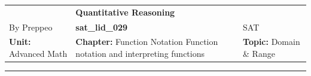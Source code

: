 \documentclass[11pt,paper=a4,answers]{exam}
\begin{document}
\begin{center}
    \centering
    \renewcommand{\arraystretch}{1.5}
    \begin{tabularx}{\textwidth}{YYY}
    & \normalsize\bf{{\Large{{Quantitative Reasoning}}}} & \\
    By Preppeo & \normalsize\bf{{sat\_lid\_029}} & SAT\\
    \normalsize{{\textbf{{Unit:}} Advanced Math}} & \normalsize{{\textbf{{Chapter:}} Function Notation	Function notation and interpreting functions}} & \normalsize{{\textbf{{Topic:}} Domain \& Range}} \\
    \end{tabularx}
\end{center}
\par\noindent\rule{\textwidth}{1pt}
\end{document}
